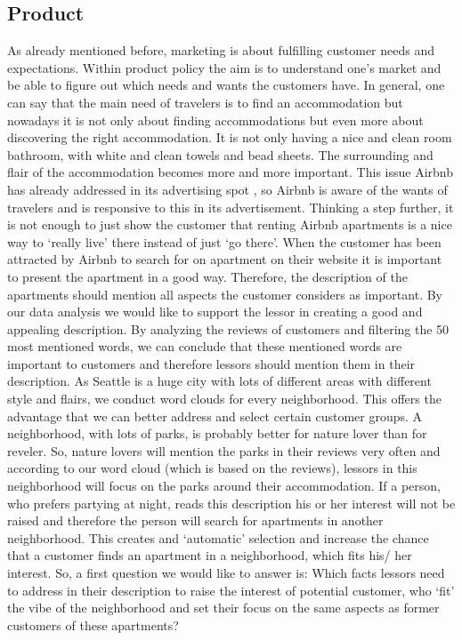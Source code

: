 \subsection{Product}
\noindent As already mentioned before, marketing is about fulfilling customer needs and expectations. Within product policy the aim is to understand one’s market and be able to figure out which needs and wants the customers have. In general, one can say that the main need of travelers is to find an accommodation but nowadays it is not only about finding accommodations but even more about discovering the right accommodation. It is not only having a nice and clean room bathroom, with white and clean towels and bead sheets. The surrounding and flair of the accommodation becomes more and more important. This issue Airbnb has already addressed in its advertising spot , so Airbnb is aware of the wants of travelers and is responsive to this in its advertisement. Thinking a step further, it is not enough to just show the customer that renting Airbnb apartments is a nice way to ‘really live’ there instead of just ‘go there’. When the customer has been attracted by Airbnb to search for on apartment on their website it is important to present the apartment in a good way. Therefore, the description of the apartments should mention all aspects the customer considers as important. By our data analysis we would like to support the lessor in creating a good and appealing description. By analyzing the reviews of customers and filtering the 50 most mentioned words, we can conclude that these mentioned words are important to customers and therefore lessors should mention them in their description. As Seattle is a huge city with lots of different areas with different style and flairs, we conduct word clouds for every neighborhood. This offers the advantage that we can better address and select certain customer groups. A neighborhood, with lots of parks, is probably better for nature lover than for reveler. So, nature lovers will mention the parks in their reviews very often and according to our word cloud (which is based on the reviews), lessors in this neighborhood will focus on the parks around their accommodation. If a person, who prefers partying at night, reads this description his or her interest will not be raised and therefore the person will search for apartments in another neighborhood. This creates and ‘automatic’ selection and increase the chance that a customer finds an apartment in a neighborhood, which fits his/ her interest. So, a first question we would like to answer is: Which facts lessors need to address in their description to raise the interest of potential customer, who ‘fit’ the vibe of the neighborhood and set their focus on the same aspects as former customers of these apartments?
